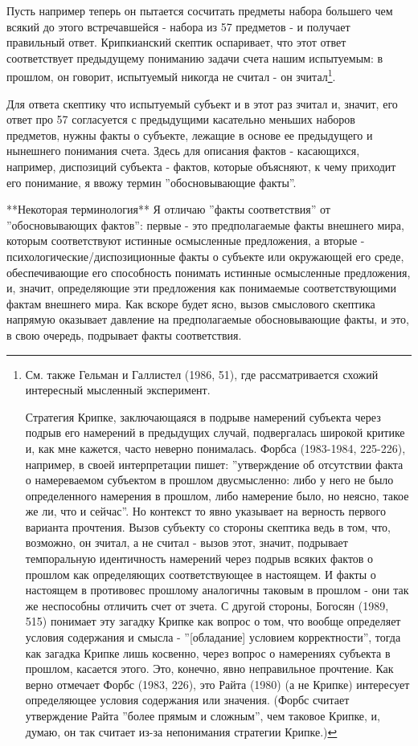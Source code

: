 \documentclass{book}
\begin{document}
Пусть например теперь он пытается сосчитать предметы набора большего чем всякий до этого встречавшейся - набора из 57 предметов - и получает правильный ответ. Крипкианский скептик оспаривает, что этот ответ соответствует предыдущему пониманию задачи счета нашим испытуемым: в прошлом, он говорит, испытуемый никогда не считал - он зчитал\footnote{См. также Гельман и Галлистел (1986, 51), где рассматривается схожий интересный мысленный эксперимент.

Стратегия Крипке, заключающаяся в подрыве намерений субъекта через подрыв его намерений в предыдущих случай, подвергалась широкой критике и, как мне кажется, часто неверно понималась. Форбса (1983-1984, 225-226), например, в своей интерпретации пишет: ''утверждение об отсутствии факта о намереваемом субъектом в прошлом двусмысленно: либо у него не было определенного намерения в прошлом, либо намерение было, но неясно, такое же ли, что и сейчас''. Но контекст то явно указывает на верность первого варианта прочтения. Вызов субъекту со стороны скептика ведь в том, что, возможно, он зчитал, а не считал - вызов этот, значит, подрывает темпоральную идентичность намерений через подрыв всяких фактов о прошлом как определяющих соответствующее в настоящем. И факты о настоящем в противовес прошлому аналогичны таковым в прошлом - они так же неспособны отличить счет от зчета. С другой стороны, Богосян (1989, 515) понимает эту загадку Крипке как вопрос о том, что вообще определяет условия содержания и смысла - ''[обладание] условием корректности'', тогда как загадка Крипке лишь косвенно, через вопрос о намерениях субъекта в прошлом, касается этого. Это, конечно, явно неправильное прочтение. Как верно отмечает Форбс (1983, 226), это Райта (1980) (а не Крипке) интересует определяющее условия содержания или значения. (Форбс считает утверждение Райта ''более прямым и сложным'', чем таковое Крипке, и, думаю, он так считает из-за непонимания стратегии Крипке.)}.

Для ответа скептику что испытуемый субъект и в этот раз зчитал и, значит, его ответ про 57 согласуется с предыдущими касательно меньших наборов предметов, нужны факты о субъекте, лежащие в основе ее предыдущего и нынешнего понимания счета. Здесь для описания фактов - касающихся, например, диспозиций субъекта - фактов, которые объясняют, к чему приходит его понимание, я ввожу термин ''обосновывающие факты''.

**Некоторая терминология** Я отличаю ''факты соответствия'' от ''обосновывающих фактов'': первые - это предполагаемые факты внешнего мира, которым соответствуют истинные осмысленные предложения, а вторые - психологические/диспозиционные факты о субъекте или окружающей его среде, обеспечивающие его способность понимать истинные осмысленные предложения, и, значит, определяющие эти предложения как понимаемые соответствующими фактам внешнего мира. Как вскоре будет ясно, вызов смыслового скептика напрямую оказывает давление на предполагаемые обосновывающие факты, и это, в свою очередь, подрывает факты соответствия.
\end{document}

